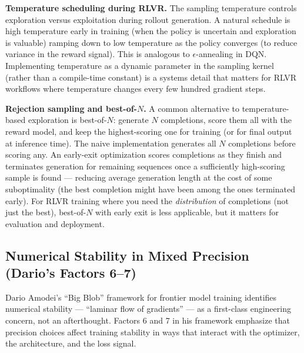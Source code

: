 \textbf{Temperature scheduling during RLVR.} The sampling temperature controls exploration versus exploitation during rollout generation. A natural schedule is high temperature early in training (when the policy is uncertain and exploration is valuable) ramping down to low temperature as the policy converges (to reduce variance in the reward signal). This is analogous to $\epsilon$-annealing in DQN. Implementing temperature as a dynamic parameter in the sampling kernel (rather than a compile-time constant) is a systems detail that matters for RLVR workflows where temperature changes every few hundred gradient steps.

\textbf{Rejection sampling and best-of-$N$.} A common alternative to temperature-based exploration is best-of-$N$: generate $N$ completions, score them all with the reward model, and keep the highest-scoring one for training (or for final output at inference time). The naive implementation generates all $N$ completions before scoring any. An early-exit optimization scores completions as they finish and terminates generation for remaining sequences once a sufficiently high-scoring sample is found --- reducing average generation length at the cost of some suboptimality (the best completion might have been among the ones terminated early). For RLVR training where you need the \textit{distribution} of completions (not just the best), best-of-$N$ with early exit is less applicable, but it matters for evaluation and deployment.

\subsection{Numerical Stability in Mixed Precision (Dario's Factors 6--7)}

Dario Amodei's ``Big Blob'' framework for frontier model training identifies numerical stability --- ``laminar flow of gradients'' --- as a first-class engineering concern, not an afterthought. Factors 6 and 7 in his framework emphasize that precision choices affect training stability in ways that interact with the optimizer, the architecture, and the loss signal.

